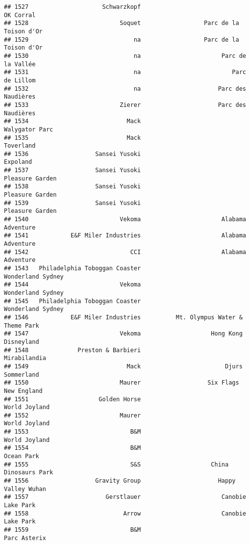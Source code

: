 \documentclass[
]{article}
\begin{document}
\begin{verbatim}
## 1527                     Schwarzkopf                               OK Corral
## 1528                          Soquet                  Parc de la Toison d'Or
## 1529                              na                  Parc de la Toison d'Or
## 1530                              na                       Parc de la Vallée
## 1531                              na                          Parc de Lillom
## 1532                              na                      Parc des Naudières
## 1533                          Zierer                      Parc des Naudières
## 1534                            Mack                          Walygator Parc
## 1535                            Mack                               Toverland
## 1536                   Sansei Yusoki                                Expoland
## 1537                   Sansei Yusoki                         Pleasure Garden
## 1538                   Sansei Yusoki                         Pleasure Garden
## 1539                   Sansei Yusoki                         Pleasure Garden
## 1540                          Vekoma                       Alabama Adventure
## 1541            E&F Miler Industries                       Alabama Adventure
## 1542                             CCI                       Alabama Adventure
## 1543   Philadelphia Toboggan Coaster                       Wonderland Sydney
## 1544                          Vekoma                       Wonderland Sydney
## 1545   Philadelphia Toboggan Coaster                       Wonderland Sydney
## 1546            E&F Miler Industries          Mt. Olympus Water & Theme Park
## 1547                          Vekoma                    Hong Kong Disneyland
## 1548              Preston & Barbieri                            Mirabilandia
## 1549                            Mack                        Djurs Sommerland
## 1550                          Maurer                   Six Flags New England
## 1551                    Golden Horse                           World Joyland
## 1552                          Maurer                           World Joyland
## 1553                             B&M                           World Joyland
## 1554                             B&M                              Ocean Park
## 1555                             S&S                    China Dinosaurs Park
## 1556                   Gravity Group                      Happy Valley Wuhan
## 1557                      Gerstlauer                       Canobie Lake Park
## 1558                           Arrow                       Canobie Lake Park
## 1559                             B&M                            Parc Asterix

\end{verbatim}
\end{document}
